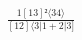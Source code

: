 \documentclass[varwidth, border=5pt]{standalone}
\begin{document}
\begin{my}
$\begin{gathered}
\scriptscriptstyle\frac{1[13]²⟨34⟩}{[12]⟨3|1+2|3]}
\end{gathered}$
\end{my}
\end{document}
